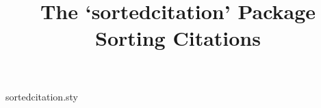 \begin{filecontents}{sortedcitation.sty}
\newenvironment{sbibliography}{%
\section *{\hypertarget{refpage}{\refname}}
\parindent=0em}
{%
\ifnum\value{citenum}>0{
\setcounter{tmp}{0}%
	\loop
		\stepcounter{tmp}
		[\csname citeentries\thetmp.seqno\endcsname]\,\csname citeentries\thetmp.ref\endcsname \\
	\ifnum \value{tmp}<\value{citenum} \repeat
	}\fi
\ifnum\value{bibnum}>0{%
\setcounter{tmp}{0}
	\loop
		\stepcounter{tmp}
		[\csname bibentries\thetmp.seqno\endcsname]\,\csname bibentries\thetmp.ref\endcsname \\
	\ifnum \value{tmp}<\value{bibnum} \repeat
	}\fi
}

\end{filecontents}

\documentclass[a4paper]{article}
\usepackage{fontspec}
\setmainfont{Rockwell} %
\usepackage{hyperref}

\usepackage{fancyvrb-ex}
\usepackage{sortedcitation}

\usepackage{tcolorbox}

\linespread{1.5}
\title{The `sortedcitation' Package \\ Sorting Citations}

\maketitle
Package sortedcitation provides 3 commands to sort the bibliography at the end of the article.

\textbackslash scite\{biblabel\}: similar to \textbackslash cite\{biblabel\}.

\textbackslash sbibitem\{biblabel\}\{the reference content\}: It is DIFFERENT from \\ . For the reference content is served as the second option.

\textbackslash begin{sbibliography}...\textbackslash end\{sbibliography\} has NO option, comparing to \textbackslash begin\{thebibliography\}\{30\}...\textbackslash end\{thebibliography\}.

The following is the example.
\vspace{30pt}

